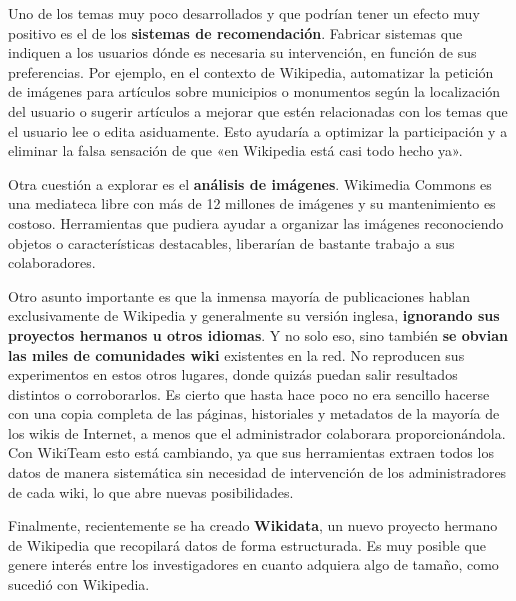 \documentclass[11pt,onecolumn]{article}
\begin{document}

Uno de los temas muy poco desarrollados y que podrían tener un efecto muy positivo es el de los \textbf{sistemas de recomendación}. Fabricar sistemas que indiquen a los usuarios dónde es necesaria su intervención, en función de sus preferencias. Por ejemplo, en el contexto de Wikipedia, automatizar la petición de imágenes para artículos sobre municipios o monumentos según la localización del usuario o sugerir artículos a mejorar que estén relacionadas con los temas que el usuario lee o edita asiduamente. Esto ayudaría a optimizar la participación y a eliminar la falsa sensación de que «en Wikipedia está casi todo hecho ya».

Otra cuestión a explorar es el \textbf{análisis de imágenes}. Wikimedia Commons es una mediateca libre con más de 12 millones de imágenes y su mantenimiento es costoso. Herramientas que pudiera ayudar a organizar las imágenes reconociendo objetos o características destacables, liberarían de bastante trabajo a sus colaboradores.


Otro asunto importante es que la inmensa mayoría de publicaciones hablan exclusivamente de Wikipedia y generalmente su versión inglesa, \textbf{ignorando sus proyectos hermanos u otros idiomas}. Y no solo eso, sino también \textbf{se obvian las miles de comunidades wiki} existentes en la red. No reproducen sus experimentos en estos otros lugares, donde quizás puedan salir resultados distintos o corroborarlos. Es cierto que hasta hace poco no era sencillo hacerse con una copia completa de las páginas, historiales y metadatos de la mayoría de los wikis de Internet, a menos que el administrador colaborara proporcionándola. Con WikiTeam esto está cambiando, ya que sus herramientas extraen todos los datos de manera sistemática sin necesidad de intervención de los administradores de cada wiki, lo que abre nuevas posibilidades.

Finalmente, recientemente se ha creado \textbf{Wikidata}, un nuevo proyecto hermano de Wikipedia que recopilará datos de forma estructurada. Es muy posible que genere interés entre los investigadores en cuanto adquiera algo de tamaño, como sucedió con Wikipedia.
\end{document}
